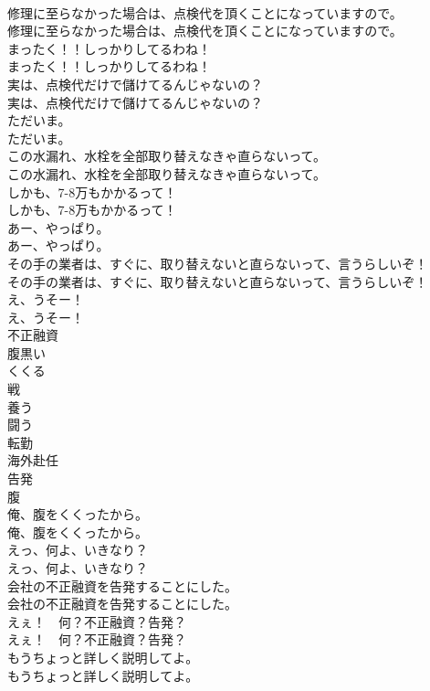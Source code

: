 \documentclass[8pt]{extreport}
\begin{document}
\begin{CJK}{UTF8}{min}
\\	修理に至らなかった場合は、点検代を頂くことになっていますので。	
\\	修理に至らなかった場合は、点検代を頂くことになっていますので。 
\\	まったく！！しっかりしてるわね！	
\\	まったく！！しっかりしてるわね！ 
\\	実は、点検代だけで儲けてるんじゃないの？	
\\	実は、点検代だけで儲けてるんじゃないの？ 
\\	ただいま。	
\\	ただいま。 
\\	この水漏れ、水栓を全部取り替えなきゃ直らないって。	
\\	この水漏れ、水栓を全部取り替えなきゃ直らないって。 
\\	しかも、7-8万もかかるって！	
\\	しかも、7-8万もかかるって！ 
\\	あー、やっぱり。	
\\	あー、やっぱり。 
\\	その手の業者は、すぐに、取り替えないと直らないって、言うらしいぞ！	
\\	その手の業者は、すぐに、取り替えないと直らないって、言うらしいぞ！ 
\\	え、うそー！	
\\	え、うそー！ 
\\	不正融資
\\	腹黒い
\\	くくる
\\	戦
\\	養う
\\	闘う
\\	転勤
\\	海外赴任
\\	告発
\\	腹
\\	俺、腹をくくったから。	
\\	俺、腹をくくったから。 
\\	えっ、何よ、いきなり？	
\\	えっ、何よ、いきなり？ 
\\	会社の不正融資を告発することにした。	
\\	会社の不正融資を告発することにした。 
\\	えぇ！　何？不正融資？告発？	
\\	えぇ！　何？不正融資？告発？　 
\\	もうちょっと詳しく説明してよ。	
\\	もうちょっと詳しく説明してよ。 

\end{CJK}
\end{document}
